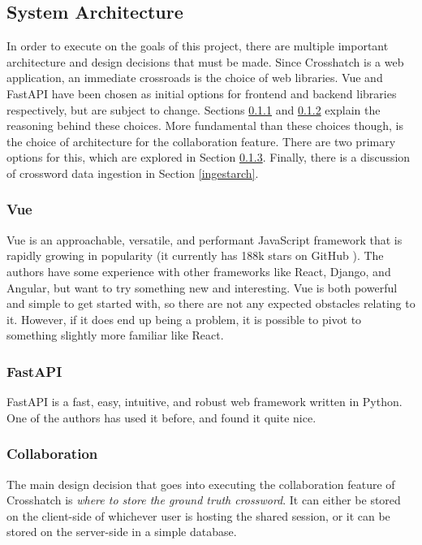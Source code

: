 \documentclass{article}
\begin{document}
\subsection{System Architecture}

In order to execute on the goals of this project, there are multiple important architecture and design decisions that must be made.
Since Crosshatch
is a web application, an immediate crossroads is the choice of web libraries. Vue and FastAPI have been chosen
as initial options for frontend and backend libraries respectively, but are subject to change. Sections \ref{vue}
and \ref{fastapi} explain the reasoning behind these choices.
More fundamental than these choices though, is the choice of architecture for the collaboration feature. There are two primary
options for this, which are explored in Section \ref{collabarch}. Finally, there is a discussion of crossword data ingestion in
Section \ref{ingestarch}.

\subsubsection{Vue}
\label{vue}
Vue \cite{vue} is an approachable, versatile, and performant JavaScript framework that is rapidly growing
in popularity (it currently has 188k stars on GitHub \cite{vuegithub}). The authors have some experience
with other frameworks like React, Django, and Angular, but want to try something new and interesting.
Vue is both powerful and simple to get started with, so there are not any expected obstacles
relating to it. However, if it does end up being a problem, it is possible to pivot to something
slightly more familiar like React.

\subsubsection{FastAPI}
\label{fastapi}
FastAPI \cite{fastapi} is a fast, easy, intuitive, and robust web framework written in Python. One of the authors
has used it before, and found it quite nice.

\subsubsection{Collaboration}
\label{collabarch}

The main design decision that goes into executing the collaboration feature of Crosshatch is \textit{where to
  store the ground truth crossword}. It can either be stored on the client-side of whichever user is
hosting the shared session, or it can be stored on the server-side in a simple database.
\end{document}
